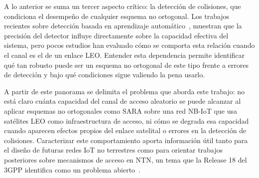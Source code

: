 A lo anterior se suma un tercer aspecto crítico: la detección de colisiones, que
condiciona el desempeño de cualquier esquema no ortogonal. Los trabajos recientes sobre
detección basada en aprendizaje automático~\cite{ref11}, muestran que la precisión del
detector influye directamente sobre la capacidad efectiva del sistema, pero pocos estudios
han evaluado cómo se comporta esta relación cuando el canal es el de un enlace LEO.
Entender esta dependencia permite identificar qué tan robusto puede ser un esquema no
ortogonal de este tipo frente a errores de detección y bajo qué condiciones sigue valiendo
la pena usarlo.

A partir de este panorama se delimita el problema que aborda este trabajo: no está claro
cuánta capacidad del canal de acceso aleatorio se puede alcanzar al aplicar esquemas no
ortogonales como SARA sobre una red NB-IoT que usa satélites LEO como infraestructura de
acceso, ni cómo se degrada esa capacidad cuando aparecen efectos propios del enlace
satelital o errores en la detección de colisiones. Caracterizar este comportamiento aporta
información útil tanto para el diseño de futuras redes IoT no terrestres como para
orientar trabajos posteriores sobre mecanismos de acceso en NTN, un tema que la Release 18
del 3GPP identifica como un problema abierto~\cite{ref7}.
